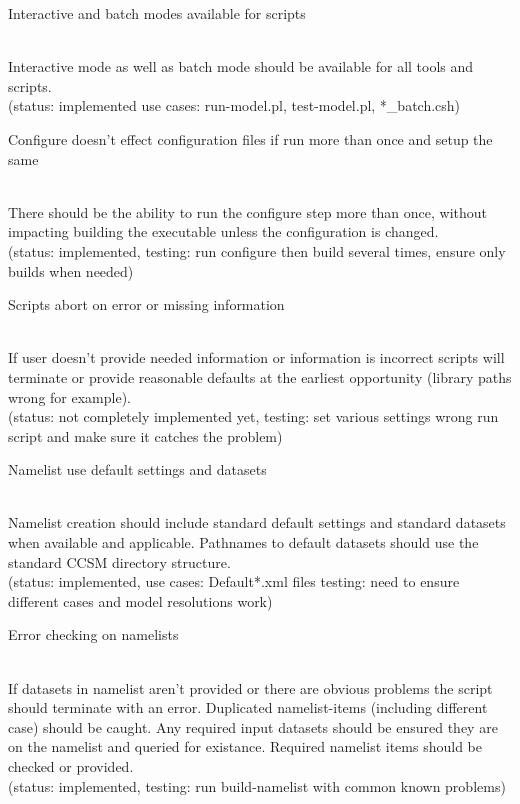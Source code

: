 \documentclass[]{article}
\begin{document}
\begin{enumerate}
{\bf\em \item Interactive and batch modes available for scripts}\\
Interactive mode as well as batch mode should be available for all tools and scripts. \\
(status: implemented use cases: run-model.pl, test-model.pl, *\_batch.csh)

{\bf\em \item Configure doesn't effect configuration files if run more than once and setup the same}\\
There should be the ability to run the configure step more than once, without impacting building 
the executable unless the configuration is changed. \\
(status: implemented, testing: run configure then build several times, ensure only builds 
when needed)

{\bf\em  \item Scripts abort on error or missing information}\\
If user doesn't provide needed information or information is incorrect scripts will terminate
or provide reasonable defaults at the earliest opportunity (library paths wrong for example).\\
(status: not completely implemented yet, testing: set various settings wrong run script and
make sure it catches the problem)

{\bf\em \item Namelist use default settings and datasets}\\
Namelist creation should include standard default settings and standard datasets when available
and applicable. Pathnames to default datasets should use the standard CCSM directory
structure.\\
(status: implemented, use cases: Default*.xml files testing: need to ensure different cases 
and model resolutions work)

{\bf\em \item Error checking on namelists}\\
If datasets in namelist aren't provided or there are obvious problems the script should terminate
with an error. Duplicated namelist-items (including different case) should be caught. Any required
input datasets should be ensured they are on the namelist and queried for existance. Required
namelist items should be checked or provided.
\\
(status: implemented, testing: run build-namelist with common known problems)


\end{enumerate}
\end{document}
